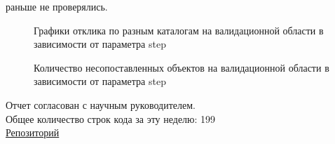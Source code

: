 \documentclass{article}
\begin{document}
\begin{enumerate}
        раньше не проверялись.\\
        \begin{figure}[h]
            \caption{Графики отклика по разным каталогам на валидационной области в зависимости от 
                параметра step}
        \end{figure}
        \begin{figure}[h]
            \caption{Количество несопоставленных объектов на валидационной области в зависимости от 
                параметра step}
        \end{figure}
\end{enumerate}

Отчет согласован с научным руководителем.\\
Общее количество строк кода за эту неделю: 199\\
\href{https://github.com/rt2122/data-segmentation-2}{Репозиторий}\\ 
\end{document}
